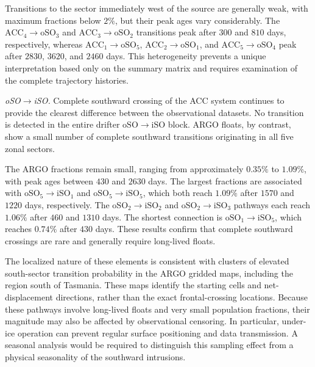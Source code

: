 \documentclass[
  draft
]{agujournal2025}
\begin{document}
                Transitions to the sector immediately west of the source are generally weak, with maximum fractions below $2 \%$, but their peak ages vary considerably. The $\mathrm{ACC}_4 \rightarrow \mathrm{oSO}_3$ and $\mathrm{ACC}_3 \rightarrow \mathrm{oSO}_2$ transitions peak after $300$ and $810$ days, respectively, whereas $\mathrm{ACC}_1 \rightarrow \mathrm{oSO}_5$, $\mathrm{ACC}_2 \rightarrow \mathrm{oSO}_1$, and $\mathrm{ACC}_5 \rightarrow \mathrm{oSO}_4$ peak after $2830$, $3620$, and $2460$ days. This heterogeneity prevents a unique interpretation based only on the summary matrix and requires examination of the complete trajectory histories.
    
                \medskip
                \noindent
                \textit{oSO$\boldsymbol{\rightarrow}$iSO.}
                Complete southward crossing of the ACC system continues to provide the clearest difference between the observational datasets. No transition is detected in the entire drifter $\mathrm{oSO} \rightarrow \mathrm{iSO}$ block. ARGO floats, by contrast, show a small number of complete southward transitions originating in all five zonal sectors.
    
                The ARGO fractions remain small, ranging from approximately $0.35 \%$ to $1.09 \%$, with peak ages between $430$ and $2630$ days. The largest fractions are associated with $\mathrm{oSO}_5 \rightarrow \mathrm{iSO}_1$ and $\mathrm{oSO}_5 \rightarrow \mathrm{iSO}_5$, which both reach $1.09 \%$ after $1570$ and $1220$ days, respectively. The $\mathrm{oSO}_2 \rightarrow \mathrm{iSO}_2$ and $\mathrm{oSO}_2 \rightarrow \mathrm{iSO}_3$ pathways each reach $1.06 \%$ after $460$ and $1310$ days. The shortest connection is $\mathrm{oSO}_1 \rightarrow \mathrm{iSO}_5$, which reaches $0.74 \%$ after $430$ days. These results confirm that complete southward crossings are rare and generally require long-lived floats.
    
                The localized nature of these elements is consistent with clusters of elevated south-sector transition probability in the ARGO gridded maps, including the region south of Tasmania. These maps identify the starting cells and net-displacement directions, rather than the exact frontal-crossing locations. Because these pathways involve long-lived floats and very small population fractions, their magnitude may also be affected by observational censoring. In particular, under-ice operation can prevent regular surface positioning and data transmission. A seasonal analysis would be required to distinguish this sampling effect from a physical seasonality of the southward intrusions.
    
\end{document}
